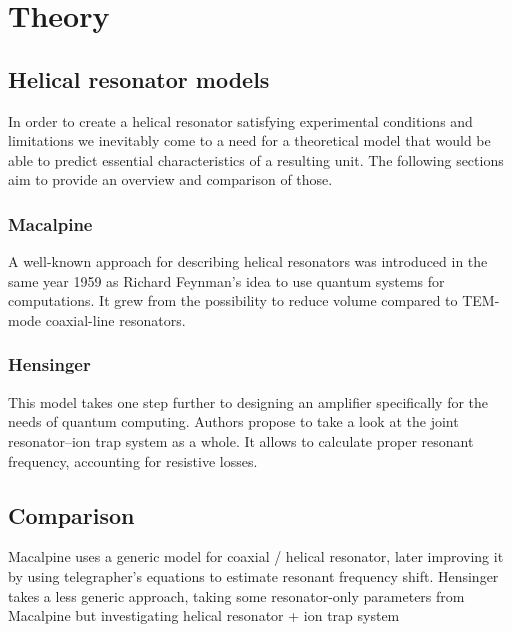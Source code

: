 \chapter{Theory}

\section{Helical resonator models}
In order to create a helical resonator satisfying experimental conditions and limitations we inevitably come to a need for a theoretical model that would be able to predict essential characteristics of a resulting unit. The following sections aim to provide an overview and comparison of those.

\subsection{Macalpine}
A well-known approach \cite{Macalpine2000} for describing helical resonators was introduced in the same year 1959 as Richard Feynman's idea \cite{Feynman1960} to use quantum systems for computations. It grew from the possibility to reduce volume compared to TEM-mode coaxial-line resonators.

\subsection{Hensinger}
This model takes one step further to designing an amplifier specifically for the needs of quantum computing. Authors propose to take a look at the joint resonator--ion trap system as a whole. It allows to calculate proper resonant frequency, accounting for resistive losses.


\section{Comparison}

Macalpine uses a generic model for coaxial / helical resonator, later improving it by using telegrapher's equations to estimate resonant frequency shift. Hensinger takes a less generic approach, taking some resonator-only parameters from Macalpine but investigating helical resonator + ion trap system